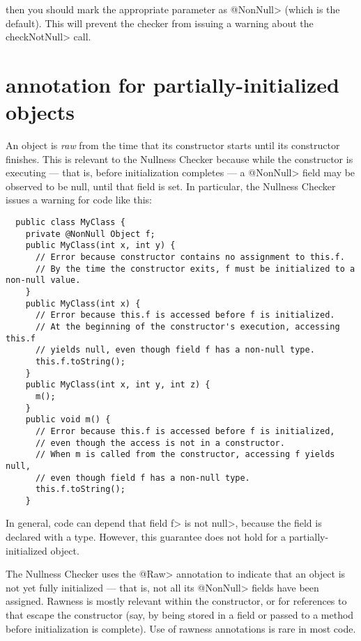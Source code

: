 \noindent
then you should mark the appropriate parameter as \<@NonNull> (which is the
default).  This will prevent the checker from issuing a warning about the
\<checkNotNull> call.


\section{ annotation for partially-initialized objects\label{raw-partially-initialized}}

An object is
\emph{raw} from the time that its constructor starts until its constructor
finishes.  This is relevant to the Nullness Checker because while the
constructor is executing --- that is, before initialization completes ---
a \<@NonNull>
field may be observed to be null, until that field is set.  In
particular, the Nullness Checker issues a warning for code like this:

\begin{Verbatim}
  public class MyClass {
    private @NonNull Object f;
    public MyClass(int x, int y) {
      // Error because constructor contains no assignment to this.f.
      // By the time the constructor exits, f must be initialized to a non-null value.
    }
    public MyClass(int x) {
      // Error because this.f is accessed before f is initialized.
      // At the beginning of the constructor's execution, accessing this.f
      // yields null, even though field f has a non-null type.
      this.f.toString();
    }
    public MyClass(int x, int y, int z) {
      m();
    }
    public void m() {
      // Error because this.f is accessed before f is initialized,
      // even though the access is not in a constructor.
      // When m is called from the constructor, accessing f yields null,
      // even though field f has a non-null type.
      this.f.toString();
    }
\end{Verbatim}

\noindent
In general, code can depend that field \<f> is not \<null>, because the
field is declared with a  type.
However, this guarantee does not hold for a partially-initialized object.

The Nullness Checker uses the \<@Raw> annotation to indicate that an object
is not yet fully initialized --- that is, not all its \<@NonNull> fields have been
assigned.  Rawness is mostly relevant within the constructor, or for
references to  that escape the constructor (say, by being stored
in a field or passed to a method before initialization is complete).  
Use of rawness annotations is rare in most code.

